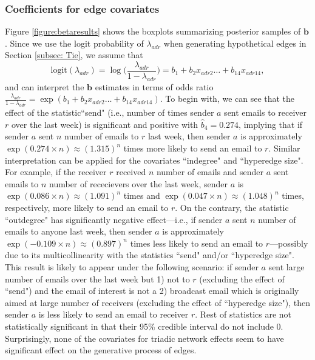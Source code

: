 \documentclass[ba]{imsart}
\numberwithin{equation}{section}
\theoremstyle{plain}
\begin{document}
	\subsubsection{Coefficients for edge covariates}
	Figure \ref{figure:betaresults} shows the boxplots summarizing posterior samples of $\boldsymbol{b}$. Since we use the logit probability of $\lambda_{adr}$ when generating hypothetical edges in Section \ref{subsec: Tie}, we assume that 
	\begin{equation*}
	\mbox{logit}(\lambda_{adr})=\log\Big(\frac{\lambda_{adr}}{1-\lambda_{adr}}\Big) =b_{1}+b_{2} x_{adr2}\ldots+b_{14}x_{adr14},
	\end{equation*}
	and can interpret the $\boldsymbol{b}$ estimates in terms of odds ratio $\frac{\lambda_{adr}}{1-\lambda_{adr}}=\exp(b_{1}+b_{2} x_{adr2}\ldots+b_{14}x_{adr14})$.
	To begin with, we can see that the effect of the statistic``send" (i.e., number of times sender $a$ sent emails to receiver $r$ over the last week) is significant and positive with $\hat{b}_4 = 0.274$, implying that if sender $a$ sent $n$ number of emails to $r$ last week, then sender $a$ is approximately $\exp(0.274\times n)\approx(1.315)^n$ times more likely to send an email to $r$. Similar interpretation can be applied for the covariates ``indegree" and ``hyperedge size". For example, if the receiver $r$ received $n$ number of emails and sender $a$ sent emails to $n$ number of rececievers over the last week, sender $a$ is $\exp(0.086\times n)\approx(1.091)^n $ times and $\exp(0.047\times n)\approx(1.048)^n$ times, respectively, more likely to send an email to $r$. On the contrary, the statistic ``outdegree" has significantly negative effect---i.e., if sender $a$ sent $n$ number of emails to anyone last week, then sender $a$ is approximately $\exp(-0.109\times n)\approx(0.897)^n$ times less likely to send an email to $r$---possibly due to its multicollinearity with the statistics ``send" and/or ``hyperedge size". This result is likely to appear under the following scenario: if sender $a$ sent large number of emails over the last week but 1) not to $r$ (excluding the effect of ``send") and the email of interest is not a  2) broadcast email which is originally aimed at large number of receivers (excluding the effect of ``hyperedge size"), then sender $a$ is less likely to send an email to receiver $r$. Rest of statistics are not statistically significant in that their 95\% credible interval do not include 0. Surprisingly, none of the covariates for triadic network effects seem to have significant effect on the generative process of edges.
\end{document}

